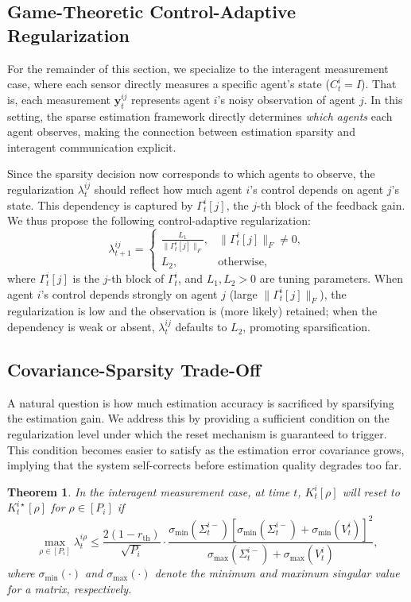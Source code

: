 \documentclass[letterpaper, 10 pt, conference]{ieeeconf}  %
\newtheorem{theorem}{Theorem}
\begin{document}
\subsection{Game-Theoretic Control-Adaptive Regularization}

For the remainder of this section, we specialize to the interagent measurement case, where each sensor directly measures a specific agent's state ($C_t^i = I$). That is, each measurement $\textbf{y}_t^{ij}$ represents agent $i$'s noisy observation of agent $j$. In this setting, the sparse estimation framework directly determines \textit{which agents} each agent observes, making the connection between estimation sparsity and interagent communication explicit.

Since the sparsity decision now corresponds to which agents to observe, the regularization $\lambda_t^{ij}$ should reflect how much agent $i$'s control depends on agent $j$'s state. This dependency is captured by $\Gamma_t^i[j]$, the $j$-th block of the feedback gain. We thus propose the following control-adaptive regularization:
\begin{equation}
\lambda_{t+1}^{ij} =
\begin{cases}
\frac{L_1}{\|\Gamma_t^i[j]\|_F}, & \|\Gamma_t^i[j]\|_F\neq 0,\\
L_2, & \text{otherwise},
\end{cases}
\label{eqn:adaptive_lambda}
\end{equation}
where $\Gamma_t^i[j]$ is the $j$-th block of $\Gamma_t^i$, and $L_1, L_2 > 0$ are tuning parameters. When agent $i$'s control depends strongly on agent $j$ (large $\|\Gamma_t^i[j]\|_F$), the regularization is low and the observation is (more likely) retained; when the dependency is weak or absent, $\lambda_t^{ij}$ defaults to $L_2$, promoting sparsification.


\subsection{Covariance-Sparsity Trade-Off}

A natural question is how much estimation accuracy is sacrificed by sparsifying the estimation gain. We address this by providing a sufficient condition on the regularization level under which the reset mechanism is guaranteed to trigger. This condition becomes easier to satisfy as the estimation error covariance grows, implying that the system self-corrects before estimation quality degrades too far.


\begin{theorem}
    In the interagent measurement case, at time $t$, $K_t^i[\rho]$ will reset to $K_t^{i\star}[\rho]$ for $\rho\in[P_i]$ if 
    \begin{equation*}
        \max_{\rho\in[P_i]}\lambda_t^{i\rho}\leq \frac{2(1-r_{\text{th}})}{\sqrt{P_i}}\cdot\frac{\sigma_\text{min}(\Sigma_t^{i-})[\sigma_\text{min}(\Sigma_t^{i-})+\sigma_\text{min}(V_t^i)]^2}{\sigma_\text{max}(\Sigma_t^{i-})+\sigma_\text{max}(V_t^i)},
    \end{equation*}
    where $\sigma_\text{min}(\cdot)$ and $\sigma_\text{max}(\cdot)$ denote the minimum and maximum singular value for a matrix, respectively.
\end{theorem}
\end{document}
